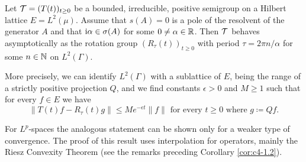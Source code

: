 \begin{proposition}\label{prop:c4-2.13}
%
%
%
Let $\mathcal{T} = (T(t))_{t\geq 0}$ be a bounded, irreducible, positive semigroup on a Hilbert lattice $E = L^{2}(\mu)$.
Assume that $s(A) = 0$ is a pole of the resolvent of the generator $A$ and that $\mathrm{i}\alpha \in \sigma(A)$ for some $0 \neq \alpha \in \mathbb{R}$.
Then $\mathcal{T}$ behaves asymptotically as the rotation group $(R_{\tau}(t))_{t \geq 0}$ with period $\tau = 2\pi n/\alpha$ for some $n \in \mathbb{N}$ on $L^{2}(\Gamma)$.

More precisely, we can identify $L^{2}(\Gamma)$ with a sublattice of $E$, being the range of a strictly positive projection $Q$, and we find constants $\epsilon > 0$ and $M \geq 1$ such that for every $f \in E$ we have
\begin{equation}\label{eq:c4-2.11}
\|T(t)f - R_{\tau}(t)g\| \leq Me^{-\epsilon t}\|f\| \text{ for every } t \geq 0 \text{ where } g \coloneqq Qf.
\end{equation}
\end{proposition}
For $L^{p}$-spaces the analogous statement can be shown only for a weaker type of convergence.
The proof of this result uses interpolation for operators, mainly the Riesz Convexity Theorem (see the remarks preceding Corollary \ref{cor:c4-1.2}).


